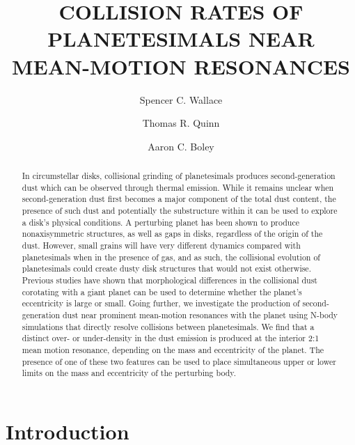 \documentclass[twocolumn]{aastex63}
\begin{document}
\title{COLLISION RATES OF PLANETESIMALS NEAR MEAN-MOTION RESONANCES}

\author{Spencer C. Wallace}

\author{Thomas R. Quinn}

\author{Aaron C. Boley}

\begin{abstract}
In circumstellar disks, collisional grinding of planetesimals produces second-generation dust which can be observed through thermal 
emission. While it remains unclear when second-generation dust first becomes a major component of the total dust content, the presence of 
such dust and potentially the substructure within it can be used to explore a disk's physical conditions. A perturbing planet has been shown to 
produce nonaxisymmetric structures, as well as gaps in disks, regardless of the origin of the dust. However, small grains will have very 
different dynamics compared with planetesimals when in the presence of gas, and as such, the collisional evolution of planetesimals could 
create dusty disk structures that would not exist otherwise. Previous studies have shown that morphological differences in the collisional dust 
corotating with a giant planet can be used to determine whether the planet's eccentricity is large or small. Going further, we investigate the 
production of second-generation dust near prominent mean-motion resonances with the planet using N-body simulations that directly resolve 
collisions between planetesimals. We find that a distinct over- or under-density in the dust emission is produced at the interior 2:1 mean motion 
resonance, depending on the mass and eccentricity of the planet. The presence of one of these two features can be used to place simultaneous 
upper or lower limits on the mass and eccentricity of the perturbing body.
\end{abstract}

\section{Introduction} \label{sec:intro}
\end{document}
